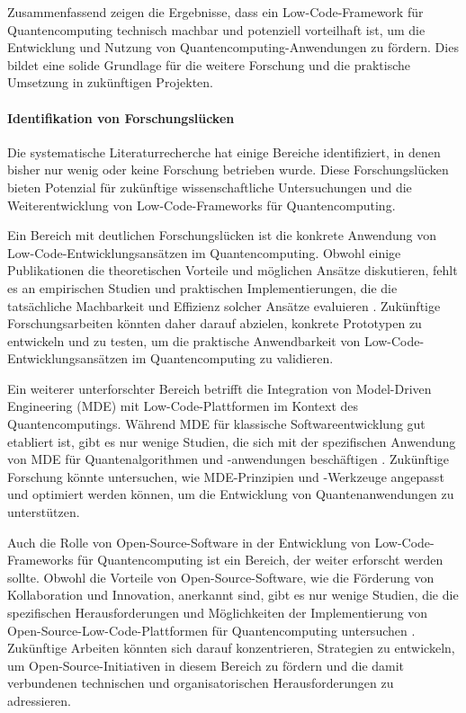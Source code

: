 Zusammenfassend zeigen die Ergebnisse, dass ein Low-Code-Framework für Quantencomputing technisch machbar und 
potenziell vorteilhaft ist, um die Entwicklung und Nutzung von Quantencomputing-Anwendungen zu fördern. Dies bildet 
eine solide Grundlage für die weitere Forschung und die praktische Umsetzung in zukünftigen Projekten.

\paragraph{Identifikation von Forschungslücken}

Die systematische Literaturrecherche hat einige Bereiche identifiziert, in denen bisher nur wenig oder keine Forschung 
betrieben wurde. Diese Forschungslücken bieten Potenzial für zukünftige wissenschaftliche Untersuchungen und 
die Weiterentwicklung von Low-Code-Frameworks für Quantencomputing.

Ein Bereich mit deutlichen Forschungslücken ist die konkrete Anwendung von Low-Code-Entwicklungsansätzen im 
Quantencomputing. Obwohl einige Publikationen die theoretischen Vorteile und möglichen Ansätze diskutieren, 
fehlt es an empirischen Studien und praktischen Implementierungen, die die tatsächliche Machbarkeit und Effizienz 
solcher Ansätze evaluieren \cite{Perez-Delgado_2020, Gemeinhardt_2021}. Zukünftige Forschungsarbeiten könnten daher 
darauf abzielen, konkrete Prototypen zu entwickeln und zu testen, um die praktische Anwendbarkeit von 
Low-Code-Entwicklungsansätzen im Quantencomputing zu validieren.

Ein weiterer unterforschter Bereich betrifft die Integration von Model-Driven Engineering (MDE) mit Low-Code-Plattformen 
im Kontext des Quantencomputings. Während MDE für klassische Softwareentwicklung gut etabliert ist, gibt es nur wenige 
Studien, die sich mit der spezifischen Anwendung von MDE für Quantenalgorithmen und -anwendungen 
beschäftigen \cite{Gemeinhardt_2023, Perez-Castillo_2022}. Zukünftige Forschung könnte untersuchen, wie MDE-Prinzipien 
und -Werkzeuge angepasst und optimiert werden können, um die Entwicklung von Quantenanwendungen zu unterstützen.

Auch die Rolle von Open-Source-Software in der Entwicklung von Low-Code-Frameworks für Quantencomputing ist ein Bereich, 
der weiter erforscht werden sollte. Obwohl die Vorteile von Open-Source-Software, wie die Förderung von Kollaboration und 
Innovation, anerkannt sind, gibt es nur wenige Studien, die die spezifischen Herausforderungen und Möglichkeiten der 
Implementierung von Open-Source-Low-Code-Plattformen für Quantencomputing untersuchen \cite{Amato_2023, Ahmad_2023}. 
Zukünftige Arbeiten könnten sich darauf konzentrieren, Strategien zu entwickeln, um Open-Source-Initiativen in diesem 
Bereich zu fördern und die damit verbundenen technischen und organisatorischen Herausforderungen zu adressieren.

